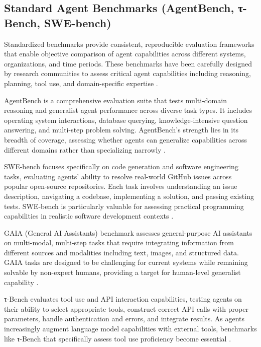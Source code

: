 
\begin{TNtwocol}
\section{Standard Agent Benchmarks (AgentBench, τ-Bench, SWE-bench)}
Standardized benchmarks provide consistent, reproducible evaluation frameworks that enable objective comparison of agent capabilities across different systems, organizations, and time periods. These benchmarks have been carefully designed by research communities to assess critical agent capabilities including reasoning, planning, tool use, and domain-specific expertise \cite{liu2023,jimenez2024,putta2024,mialon2023}.

AgentBench is a comprehensive evaluation suite that tests multi-domain reasoning and generalist agent performance across diverse task types. It includes operating system interactions, database querying, knowledge-intensive question answering, and multi-step problem solving. AgentBench's strength lies in its breadth of coverage, assessing whether agents can generalize capabilities across different domains rather than specializing narrowly \cite{liu2023}.

SWE-bench focuses specifically on code generation and software engineering tasks, evaluating agents' ability to resolve real-world GitHub issues across popular open-source repositories. Each task involves understanding an issue description, navigating a codebase, implementing a solution, and passing existing tests. SWE-bench is particularly valuable for assessing practical programming capabilities in realistic software development contexts \cite{jimenez2024}.

GAIA (General AI Assistants) benchmark assesses general-purpose AI assistants on multi-modal, multi-step tasks that require integrating information from different sources and modalities including text, images, and structured data. GAIA tasks are designed to be challenging for current systems while remaining solvable by non-expert humans, providing a target for human-level generalist capability \cite{mialon2023}.

τ-Bench evaluates tool use and API interaction capabilities, testing agents on their ability to select appropriate tools, construct correct API calls with proper parameters, handle authentication and errors, and integrate results. As agents increasingly augment language model capabilities with external tools, benchmarks like τ-Bench that specifically assess tool use proficiency become essential \cite{putta2024}.


\end{TNtwocol}
